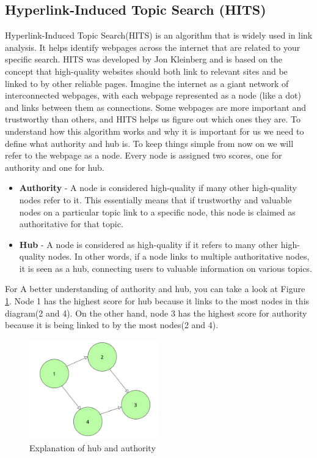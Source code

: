 \documentclass[10pt,english,a4paper]{article}
\begin{document}
\subsection{Hyperlink-Induced Topic Search (HITS)}\label{hits}
Hyperlink-Induced Topic Search(HITS) is an algorithm that is widely used in link analysis. It helps identify webpages across the internet that are related to your specific search. HITS was developed by Jon Kleinberg and is based on the concept that high-quality websites should both link to relevant sites and be linked to by other reliable pages. Imagine the internet as a giant network of interconnected webpages, with each webpage represented as a node (like a dot) and links between them as connections. Some webpages are more important and trustworthy than others, and HITS helps us figure out which ones they are. To understand how this algorithm works and why it is important for us we need to define what authority and hub is. To keep things simple from now on we will refer to the webpage as a node. Every node is assigned two scores, one for authority and one for hub.
\begin{itemize}
	\item \textbf{Authority} - A node is considered high-quality if many other high-quality nodes refer to it. This essentially means that if trustworthy and valuable nodes on a particular topic link to a specific node, this node is claimed as authoritative for that topic.
	\item \textbf{Hub} - A node is considered as high-quality if it refers to many other high-quality nodes. In other words, if a node links to multiple authoritative nodes, it is seen as a hub, connecting users to valuable information on various topics.
\end{itemize}
For A better understanding of authority and hub, you can take a look at Figure \ref{explanationHITS}. Node 1 has the highest score for hub because it links to the most nodes in this diagram(2 and 4). On the other hand, node 3 has the highest score for authority because it is being linked to by the most nodes(2 and 4).
\begin{figure}
  \centering
  \includegraphics[width=0.5\textwidth]{explanation_HITS.png}
  \caption{Explanation of hub and authority}
  \label{explanationHITS}
\end{figure}
\end{document}
